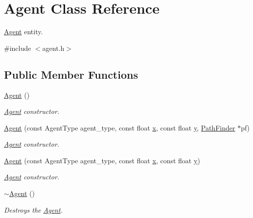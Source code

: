 \hypertarget{class_agent}{}\section{Agent Class Reference}
\label{class_agent}


\mbox{\hyperlink{class_agent}{Agent}} entity.  




{\ttfamily \#include $<$agent.\+h$>$}

\subsection*{Public Member Functions}
\begin{DoxyCompactItemize}
\item 
\mbox{\hyperlink{class_agent_a24a60f1d260bf19a4f7f8a5f36881d3f}{Agent}} ()
\begin{DoxyCompactList}\small\item\em \mbox{\hyperlink{class_agent}{Agent}} constructor. \end{DoxyCompactList}\item 
\mbox{\hyperlink{class_agent_a5818e33f8735384a8e74a8be0417636e}{Agent}} (const Agent\+Type agent\+\_\+type, const float \mbox{\hyperlink{class_agent_a51aac7a6281e83d26d4c85475851cbf4}{x}}, const float \mbox{\hyperlink{class_agent_a077acfc535e9ef3b0630beaa818627a4}{y}}, \mbox{\hyperlink{class_path_finder}{Path\+Finder}} $\ast$pf)
\begin{DoxyCompactList}\small\item\em \mbox{\hyperlink{class_agent}{Agent}} constructor. \end{DoxyCompactList}\item 
\mbox{\hyperlink{class_agent_a60d156a1030622542fd9d05d75f1a228}{Agent}} (const Agent\+Type agent\+\_\+type, const float \mbox{\hyperlink{class_agent_a51aac7a6281e83d26d4c85475851cbf4}{x}}, const float \mbox{\hyperlink{class_agent_a077acfc535e9ef3b0630beaa818627a4}{y}})
\begin{DoxyCompactList}\small\item\em \mbox{\hyperlink{class_agent}{Agent}} constructor. \end{DoxyCompactList}\item 
\mbox{\hyperlink{class_agent_ab8dd8d152605cf1339fed595376e83cb}{$\sim$\+Agent}} ()
\begin{DoxyCompactList}\small\item\em Destroys the \mbox{\hyperlink{class_agent}{Agent}}. \end{DoxyCompactList}\item 

\end{DoxyCompactItemize}
